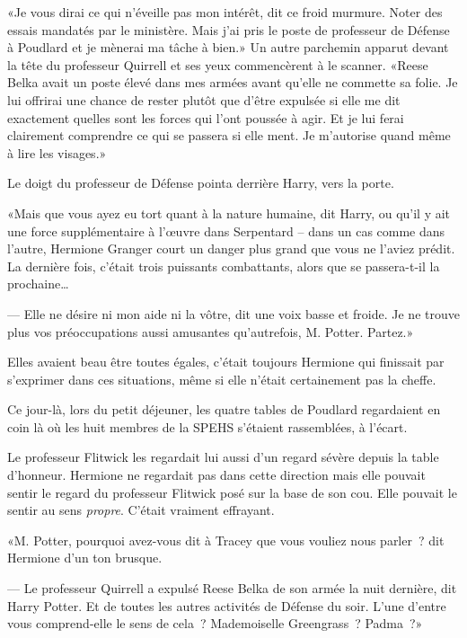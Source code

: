 «Je vous dirai ce qui n'éveille pas mon intérêt, dit ce froid murmure. Noter des essais mandatés par le ministère. Mais j'ai pris le poste de professeur de Défense à Poudlard et je mènerai ma tâche à bien.» Un autre parchemin apparut devant la tête du professeur Quirrell et ses yeux commencèrent à le scanner. «Reese Belka avait un poste élevé dans mes armées avant qu'elle ne commette sa folie. Je lui offrirai une chance de rester plutôt que d'être expulsée si elle me dit exactement quelles sont les forces qui l'ont poussée à agir. Et je lui ferai clairement comprendre ce qui se passera si elle ment. Je m'autorise quand même à lire les visages.»

Le doigt du professeur de Défense pointa derrière Harry, vers la porte.

«Mais que vous ayez eu tort quant à la nature humaine, dit Harry, ou qu'il y ait une force supplémentaire à l'œuvre dans Serpentard -- dans un cas comme dans l'autre, Hermione Granger court un danger plus grand que vous ne l'aviez prédit. La dernière fois, c'était trois puissants combattants, alors que se passera-t-il la prochaine…

--- Elle ne désire ni mon aide ni la vôtre, dit une voix basse et froide. Je ne trouve plus vos préoccupations aussi amusantes qu'autrefois, M. Potter. Partez.»

\later

Elles avaient beau être toutes égales, c'était toujours Hermione qui finissait par s'exprimer dans ces situations, même si elle n'était certainement pas la cheffe.

Ce jour-là, lors du petit déjeuner, les quatre tables de Poudlard regardaient en coin là où les huit membres de la SPEHS s'étaient rassemblées, à l'écart.

Le professeur Flitwick les regardait lui aussi d'un regard sévère depuis la table d'honneur. Hermione ne regardait pas dans cette direction mais elle pouvait sentir le regard du professeur Flitwick posé sur la base de son cou. Elle pouvait le sentir au sens \emph{propre}. C'était vraiment effrayant.

«M. Potter, pourquoi avez-vous dit à Tracey que vous vouliez nous parler~? dit Hermione d'un ton brusque.

--- Le professeur Quirrell a expulsé Reese Belka de son armée la nuit dernière, dit Harry Potter. Et de toutes les autres activités de Défense du soir. L'une d'entre vous comprend-elle le sens de cela~? Mademoiselle Greengrass~? Padma~?»


